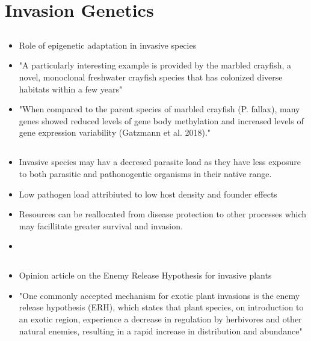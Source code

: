 \documentclass[document.tex]{subfiles}
\begin{document}
\section{Invasion Genetics}
    \subsection{}
    \begin{itemize}
    \item Role of epigenetic adaptation in invasive species 
    \item "A particularly interesting example is provided by the marbled crayfish, a novel, monoclonal freshwater crayfish species that has colonized diverse habitats within a few years"
    \item "When compared to the parent species of marbled crayfish (P. fallax), many genes showed reduced levels of gene body methylation and increased levels of gene expression variability (Gatzmann et al. 2018)."
    \end{itemize}


    \subsection{}
    \begin{itemize}
    \item Invasive species may hav a decresed parasite load as they have less exposure to both parasitic and pathonogentic organisms in their native range.
    \item Low pathogen load attribiuted to low host density and founder effects
    \item Resources can be reallocated from disease protection to other processes which may facillitate greater survival and invasion.
    \item 
    \end{itemize}

    \subsection{}
    \begin{itemize}
    \item Opinion article on the Enemy Release Hypothesis for invasive plants 
    \item "One commonly accepted mechanism for exotic plant invasions is the enemy release hypothesis (ERH), which states that plant species, on introduction to an exotic region, experience a decrease in regulation by herbivores and other natural enemies, resulting in a rapid increase in distribution and abundance"
    \end{itemize}
\end{document}
